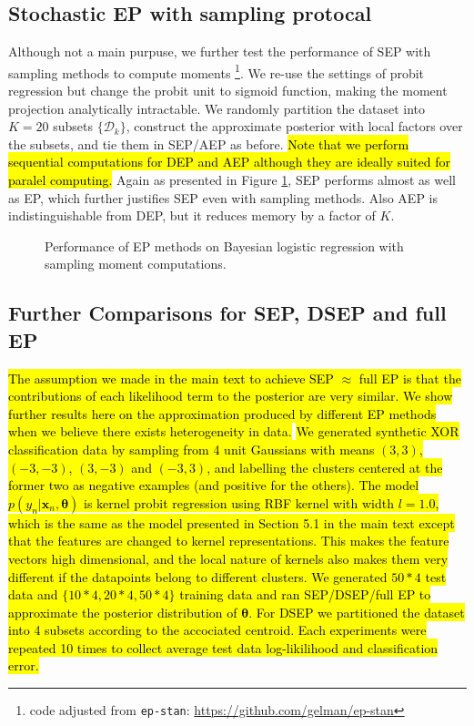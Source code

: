 \documentclass{article} %
\begin{document}
\subsection{Stochastic EP with sampling protocal}

Although not a main purpuse, we further test the performance of SEP with sampling methods to compute moments \footnote{code adjusted from \texttt{ep-stan}: \url{https://github.com/gelman/ep-stan}}. We re-use the settings of probit regression but change the probit unit to sigmoid function, making the moment projection analytically intractable. We randomly partition the dataset into $K = 20$ subsets $\{\mathcal{D}_k\}$, construct the approximate posterior with local factors over the subsets, and tie them in SEP/AEP as before. \hl{Note that we perform sequential computations for DEP and AEP although they are ideally suited for paralel computing.} Again as presented in Figure \ref{fig:sep_logit}, SEP performs almost as well as EP, which further justifies SEP even with sampling methods. Also AEP is indistinguishable from DEP, but it reduces memory by a factor of $K$.

\begin{figure}
\centering
\def\svgwidth{0.3\linewidth}

\caption{Performance of EP methods on Bayesian logistic regression with sampling moment computations.}
\label{fig:sep_logit}
\end{figure}


\subsection{Further Comparisons for SEP, DSEP and full EP}
\hl{The assumption we made in the main text to achieve SEP $\approx$ full EP is that the contributions of each likelihood term to the posterior are very similar. We show further results here on the approximation produced by different EP methods when we believe there exists heterogeneity in data.}
%
\hl{We generated synthetic XOR classification data by sampling from 4 unit Gaussians with means $(3, 3)$, $(-3, -3)$, $(3, -3)$ and $(-3, 3)$, and labelling the clusters centered at the former two as negative examples (and positive for the others). The model $p(y_n|\bm{x}_n, \bm{\theta})$ is kernel probit regression using RBF kernel with width $l=1.0$, which is the same as the model presented in Section 5.1 in the main text except that the features are changed to kernel representations. This makes the feature vectors high dimensional, and the local nature of kernels also makes them very different if the datapoints belong to different clusters. We generated $50*4$ test data and $\{10*4, 20*4, 50*4\}$ training data and ran SEP/DSEP/full EP to approximate the posterior distribution of $\bm{\theta}$. For DSEP we partitioned the dataset into 4 subsets according to the accociated centroid. Each experiments were repeated 10 times to collect average test data log-likilihood and classification error.}
\end{document}

